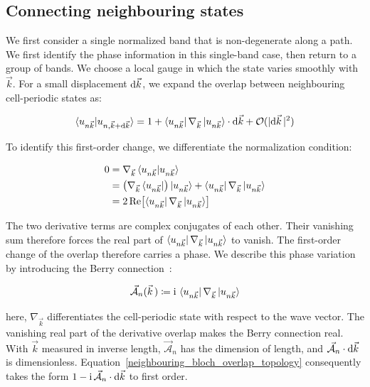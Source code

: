 \subsection{Connecting neighbouring states}

We first consider a single normalized band that is non-degenerate along a path.
We first identify the phase information in this single-band case, then return to a group of bands.
We choose a local gauge in which the state varies smoothly with $\vec{k}$.
For a small displacement $\mathrm{d}\vec{k}$, we expand the overlap between neighbouring cell-periodic states as:

\begin{equation}
    \braket{u_{n\vec{k}}|u_{n,\vec{k}+\mathrm{d}\vec{k}}}
    =1+
    \bra{u_{n\vec{k}}}\nabla_{\vec{k}}\ket{u_{n\vec{k}}}
    \cdot\mathrm{d}\vec{k}
    +\mathcal{O}(|\mathrm{d}\vec{k}\,|^2)
\label{neighbouring_bloch_overlap_topology}
\end{equation}

To identify this first-order change, we differentiate the normalization condition:

\begin{equation}
\begin{aligned}
    0&=\nabla_{\vec{k}}\braket{u_{n\vec{k}}|u_{n\vec{k}}} \\
    &=\bigl(\nabla_{\vec{k}}\bra{u_{n\vec{k}}}\bigr)\ket{u_{n\vec{k}}}
    +\bra{u_{n\vec{k}}}\nabla_{\vec{k}}\ket{u_{n\vec{k}}} \\
    &=2\operatorname{Re}\!\left[
    \bra{u_{n\vec{k}}}\nabla_{\vec{k}}\ket{u_{n\vec{k}}}\right]
\end{aligned}
\label{normalization_derivative_topology}
\end{equation}

The two derivative terms are complex conjugates of each other.
Their vanishing sum therefore forces the real part of
$\bra{u_{n\vec{k}}}\nabla_{\vec{k}}\ket{u_{n\vec{k}}}$ to vanish.
The first-order change of the overlap therefore carries a phase.
We describe this phase variation by introducing the Berry connection~\cite{berry1984quantal}:

\begin{equation}
    \vec{\mathcal{A}}_n(\vec{k}\,)
    \coloneqq\mathrm{i}\,
    \bra{u_{n\vec{k}}}\nabla_{\vec{k}}\ket{u_{n\vec{k}}}
\label{berry_connection_topology}
\end{equation}

here, $\nabla_{\vec{k}}$ differentiates the cell-periodic state with respect to the wave vector.
The vanishing real part of the derivative overlap makes the Berry connection real.
With $\vec{k}$ measured in inverse length, $\vec{\mathcal{A}}_n$ has the dimension of length,
and $\vec{\mathcal{A}}_n\cdot\mathrm{d}\vec{k}$ is dimensionless.
Equation~\eqref{neighbouring_bloch_overlap_topology} consequently takes the form
$1-\mathrm{i}\,\vec{\mathcal{A}}_n\cdot\mathrm{d}\vec{k}$ to first order.

